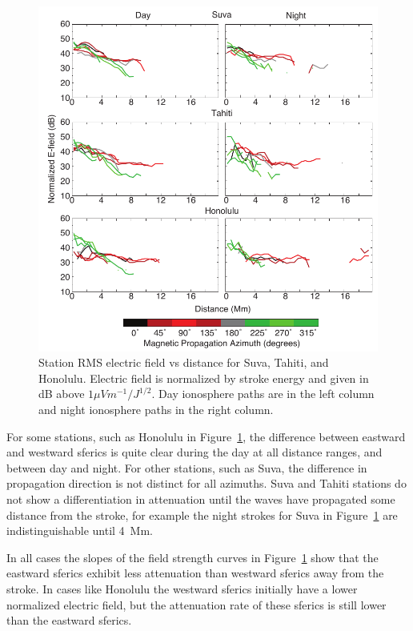  \begin{figure}[h!t]
   \centering
   \includegraphics[scale=1]{Azimuth/Figures/e-field_3.pdf} 
   \caption{Station RMS electric field vs distance for Suva, Tahiti, and Honolulu.
   	Electric field is normalized by stroke energy and given in dB above $1 \mu Vm^{-1}/J^{1/2}$.
	Day ionosphere paths are in the left column and night ionosphere paths in the right column.}
   \label{azimuth}
\end{figure}

For some stations, such as Honolulu in Figure~\ref{azimuth}, the difference between eastward and westward sferics is quite clear during the day at all distance ranges, and between day and night.
For other stations, such as Suva, the difference in propagation direction is not distinct for all azimuths.
Suva and Tahiti stations do not show a differentiation in attenuation until the waves have propagated some distance from the stroke, for example the night strokes for Suva in Figure~\ref{azimuth} are indistinguishable until 4~Mm.

In all cases the slopes of the field strength curves in Figure~\ref{azimuth} show that the eastward sferics exhibit less attenuation than westward sferics away from the stroke.
In cases like Honolulu the westward sferics initially have a lower normalized electric field, but the attenuation rate of these sferics is still lower than the eastward sferics.
  

